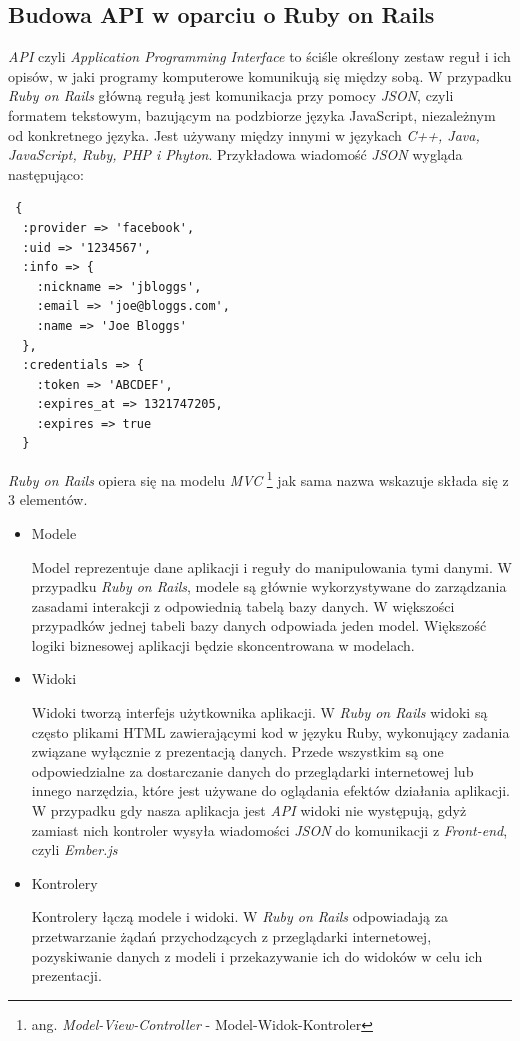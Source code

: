 \documentclass[openright]{xmgr}
\begin{document}
\subsection{Budowa API w oparciu o Ruby on Rails}
\textit{API} czyli \textit{Application Programming Interface} to  ściśle określony zestaw reguł i ich opisów, w jaki programy komputerowe komunikują się między sobą. W przypadku \textit{Ruby on Rails} główną regułą jest komunikacja przy pomocy \textit{JSON}, czyli formatem tekstowym, bazującym na podzbiorze języka JavaScript, niezależnym od konkretnego języka. Jest używany między innymi w językach \textit{ C++, Java, JavaScript, Ruby, PHP i Phyton}. Przykładowa wiadomość \textit{JSON} wygląda następująco:
\begin{verbatim}
 {
  :provider => 'facebook',
  :uid => '1234567',
  :info => {
    :nickname => 'jbloggs',
    :email => 'joe@bloggs.com',
    :name => 'Joe Bloggs'
  },
  :credentials => {
    :token => 'ABCDEF', 
    :expires_at => 1321747205, 
    :expires => true 
  }
\end{verbatim}
\newpage
\indent \textit{Ruby on Rails} opiera się na modelu \textit{MVC} \footnote{ang. \textit{Model-View-Controller} - Model-Widok-Kontroler} jak sama nazwa wskazuje składa się z 3 elementów.  
\begin{itemize}
  \item Modele

Model reprezentuje dane aplikacji i reguły do manipulowania tymi danymi. W przypadku \textit{Ruby on Rails}, modele są głównie wykorzystywane do zarządzania zasadami interakcji z odpowiednią tabelą bazy danych. W większości przypadków jednej tabeli bazy danych odpowiada jeden model. Większość logiki biznesowej aplikacji będzie skoncentrowana w modelach.
  \item Widoki

Widoki tworzą interfejs użytkownika aplikacji. W \textit{Ruby on Rails} widoki są często plikami HTML zawierającymi kod w języku Ruby, wykonujący zadania związane wyłącznie z prezentacją danych. Przede wszystkim są one odpowiedzialne za dostarczanie danych do przeglądarki internetowej lub innego narzędzia, które jest używane do oglądania efektów działania aplikacji. W przypadku gdy nasza aplikacja jest \textit{API} widoki nie występują, gdyż zamiast nich kontroler wysyła wiadomości \textit{JSON} do komunikacji z \textit{Front-end}, czyli \textit{Ember.js}
  \item Kontrolery

Kontrolery łączą modele i widoki. W \textit{Ruby on Rails} odpowiadają za przetwarzanie żądań przychodzących z przeglądarki internetowej, pozyskiwanie danych z modeli i przekazywanie ich do widoków w celu ich prezentacji.
\end{itemize}
\end{document}
